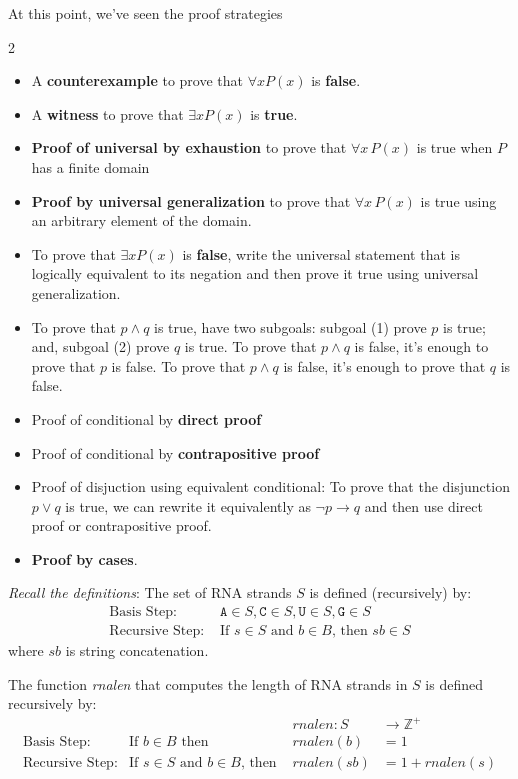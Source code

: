 \documentclass[12pt, oneside]{article}
\newcommand{\A}[0]{\texttt{A}}
\newcommand{\C}[0]{\texttt{C}}
\newcommand{\G}[0]{\texttt{G}}
\newcommand{\U}[0]{\texttt{U}}
\begin{document}
At this point, we've seen the proof strategies
\begin{multicols}{2}
    \begin{itemize}
        \item A {\bf counterexample} to prove that  $\forall x P(x)$ is {\bf false}.
        \item  A {\bf witness} to prove that  $\exists x P(x)$ is {\bf true}.
        \item {\bf Proof of universal by exhaustion} to prove that $\forall x \, P(x)$
    is true when $P$ has a finite domain
        \item  {\bf Proof by universal generalization} to prove that $\forall x \, P(x)$
    is true using an arbitrary element of the domain.
        \item To  prove  that $\exists x P(x)$ is {\bf false}, write the universal statement that is 
        logically equivalent to its negation and then prove it true using universal generalization.
        \item To prove that $p \land q$ is true, have two subgoals: 
        subgoal (1) prove $p$ is  true; and, subgoal (2) prove $q$ is true. To prove that $p \land q$ is false, it's enough to prove that $p$ is false.
     To prove that $p \land q$ is false, it's enough to prove that $q$ is false.
        \item Proof of conditional by {\bf direct proof}
        \item Proof of conditional by {\bf contrapositive proof}
        \item Proof of disjuction using equivalent conditional: To prove that the 
        disjunction $p \lor q$ is true, we can rewrite it equivalently as $\lnot p \to q$ and
        then use direct proof or contrapositive proof.
        \item {\bf Proof by cases}.
    \end{itemize}
\end{multicols}



{\it Recall the definitions}: The set of RNA strands $S$ is defined (recursively) by:
\[
\begin{array}{ll}
\textrm{Basis Step: } & \A \in S, \C \in S, \U \in S, \G \in S \\
\textrm{Recursive Step: } & \textrm{If } s \in S\textrm{ and }b \in B \textrm{, then }sb \in S
\end{array}
\]
where $sb$ is string concatenation.

The function \textit{rnalen} that computes the length of RNA strands in $S$ is defined recursively by:
\[
\begin{array}{llll}
& & \textit{rnalen} : S & \to \mathbb{Z}^+ \\
\textrm{Basis Step:} & \textrm{If } b \in B\textrm{ then } & \textit{rnalen}(b) & = 1 \\
\textrm{Recursive Step:} & \textrm{If } s \in S\textrm{ and }b \in B\textrm{, then  } & \textit{rnalen}(sb) & = 1 + \textit{rnalen}(s)
\end{array}
\]
\end{document}
